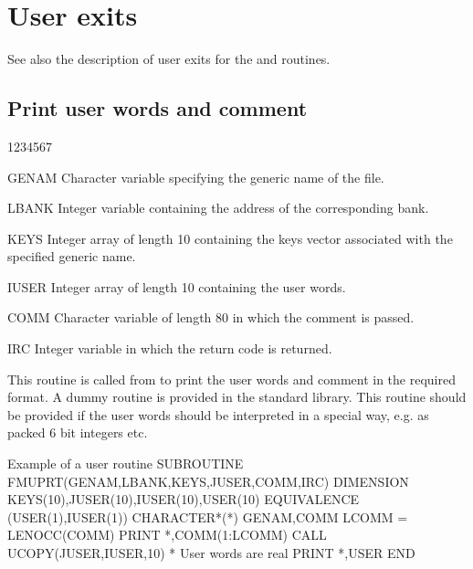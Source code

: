 \section{User exits}
\par
See also the description of user exits for the  and 
routines.
\subsection{Print user words and comment}
\begin{DLtt}{1234567}
\item[GENAM]
Character variable specifying the generic name of the file.
\item[LBANK]
Integer variable containing the address of the corresponding bank.
\item[KEYS]
Integer array of length 10 containing  the keys vector associated
with the specified generic name.
\item[IUSER]
Integer array of length 10 containing the user words.
\item[COMM]
Character variable of length 80 in which the comment is passed.
\item[IRC]
Integer variable in which the return code is returned.
\end{DLtt}

This routine is called from  to print the user words and
comment in the required format. A dummy routine is provided
in the standard library. This routine should be provided
if the user words should be interpreted in a special way,
e.g. as packed 6 bit integers etc.
\begin{XMPt}{Example of a user \protect{} routine}
      SUBROUTINE FMUPRT(GENAM,LBANK,KEYS,JUSER,COMM,IRC)
      DIMENSION KEYS(10),JUSER(10),IUSER(10),USER(10)
      EQUIVALENCE (USER(1),IUSER(1))
      CHARACTER*(*) GENAM,COMM
      LCOMM = LENOCC(COMM)
      PRINT *,COMM(1:LCOMM)
      CALL UCOPY(JUSER,IUSER,10)
*     User words are real
      PRINT *,USER
      END
\end{XMPt}
